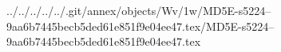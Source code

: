 ../../../../../.git/annex/objects/Wv/1w/MD5E-s5224--9aa6b7445becb5ded61e851f9e04ee47.tex/MD5E-s5224--9aa6b7445becb5ded61e851f9e04ee47.tex